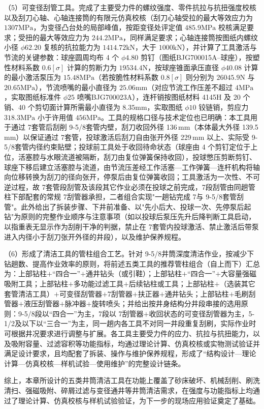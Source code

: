 （5）可变径刮管工具。完成了主要受力件的螺纹强度、零件抗拉与抗扭强度校核以及刮刀心轴、心轴连接筒的有限元仿真校核（刮刀心轴受拉的最大等效应力为 $1307\mathrm{MPa}$，为变径凸台处的局部峰值，按距变径处评定值 $485.9\mathrm{MPa}$ 校核满足要求；受扭的最大等效应力为 $244.2\mathrm{MPa}$，同样满足要求；心轴连接筒按图纸内螺纹小径 $\phi 62.20$ 复核的抗拉能力为 $1414.72\mathrm{kN}$，大于 $1000\mathrm{kN}$），并计算了工具激活与节流的关键参数：球座圆周均布 4 个 $\phi 4.80$ 剪钉（图纸BJG700015A--球座），按塑性材料系数 $0.6[\sigma]$ 计算的剪断力为 $19534.4\mathrm{N}$，按球座锥面承压直径 $\phi 40.08$ 计算的最小激活泵压为 $15.48\mathrm{MPa}$（若按脆性材料系数 $0.8[\sigma]$ 则分别为 $26045.9\mathrm{N}$ 与 $20.65\mathrm{MPa}$），节流喷嘴的最小直径为 $25.06\mathrm{mm}$（对应节流工作压差不超过 $4\mathrm{MPa}$，实取图纸标准件 $\phi 25$ 喷嘴BJG700023A），连杆销按图纸材料 4145H 及 20 个销、40 个剪切面计算所需最小直径为 $8.35\mathrm{mm}$，实取图纸 $\phi 10$ 铰链销，剪应力 $318.3\mathrm{MPa}$ 小于许用值 $456\mathrm{MPa}$。工具的规格口径与技术定位也已明确：本工具用于通过 7\inch 套管后刮削 9-5/8\inch 套管内壁，刮刀收回外径 136\,mm（本体最大外径 139.5\,mm）以保证通过 7\inch 套管，投球激活后刮刀自由张开外径 229\,mm 以上、实际受 9-5/8\inch 套管内径约束贴壁；投球前工具处于收回待命状态（球座由 4 个剪钉定位于上位，活塞腔与水眼流道被隔断，刮刀由复位弹簧保持收回），投球憋压剪断剪钉、球座下移后建立活塞腔与流道，由节流压差经工作活塞—工作弹簧—连杆机构将轴向位移转换为刮刀的径向张开，停泵后由复位弹簧收回；工具激活为一次性、不可逆过程，故 7\inch 套管段刮管及该段其它作业必须在投球之前完成，7\inch 段刮管由同趟管柱下部配套的常规 7\inch 刮管器承担，二者组合实现"一趟钻完成 7\inch 与 9-5/8\inch 套管刮管"。此外给出了拆装步骤、下井前准备、以"先小后大、投球一次、先停泵后起钻"为原则的完整作业顺序与注意事项（如以投球后泵压先升后降判断工具启动，以指重表无显示作为刮削干净的判据，禁止在 7\inch 套管内投球激活、禁止激活后带泵进入内径小于刮刀张开外径的井段），以及维护保养规程。

（6）形成了清洁工具的管柱组合工艺。针对 9-5/8\inch 井筒深度清洁作业，按减少下钻趟数、提高作业效率的原则，将前述五类工具的推荐管柱组合（自上而下）汇总为：上部钻柱$+$“四合一”$+$通井钻头（或引鞋）；上部钻柱$+$“四合一”$+$大容量强磁吸附工具；上部钻柱$+$多功能过滤工具$+$后续钻柱或工具；上部钻柱$+$（选装其它套管清洁工具）$+$可变径刮管器$+$7\inch 刮管器$+$扶正器$+$通井钻头；上部钻柱$+$毛刷刮管器$+$液压刮管器$+$脉冲器$+$旋转喷头；并给出按井身结构分井段串接的选用原则：9-5/8\inch 段以“四合一”为主，7\inch 段以 7\inch 刮管器$+$收回状态的可变径刮管器为主，5-1/2\inch 及以下以“三合一”为主，同一趟内各工具不对同一井段重复刮刷，实际作业时可根据井况要求进行调整与扩展。各工具主要受力件的应力、抗拉与抗扭能力，以及吸附容量、过滤容积等功能指标，均通过理论计算、仿真校核或实物测试验证并满足设计要求，且均配套了拆装、操作与维护保养规程，形成了“结构设计—理论计算—仿真校核—样机试验—使用维护”的完整设计链条。

综上，本章所设计的五类井筒清洁工具在功能上覆盖了砂床破坏、机械刮削、刷洗清扫、强磁吸附、碎屑过滤与变径通井等井筒清洁需求，在强度与功能指标上均通过了理论计算、仿真校核与样机试验验证，为下一步的现场应用验证奠定了基础。
